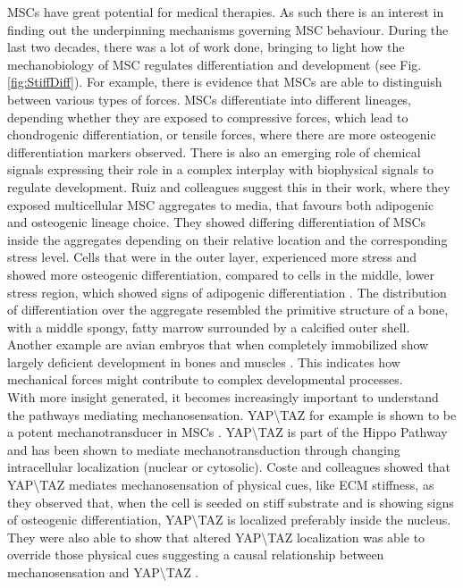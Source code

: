 MSCs have great potential for medical therapies. As such there is an interest in finding out the underpinning mechanisms governing MSC behaviour. During the last two decades, there was a lot of work done, bringing to light how the mechanobiology of MSC regulates differentiation and development (see Fig. \ref{fig:StiffDiff}). For example, there is evidence that MSCs are able to distinguish between various types of forces. MSCs differentiate into different lineages, depending whether they are exposed to compressive forces, which lead to chondrogenic differentiation, or tensile forces, where there are more osteogenic differentiation markers observed.\cite{Kearney2010, Saitoh2000} There is also an emerging role of chemical signals expressing their role in a complex interplay with biophysical signals to regulate development. Ruiz and colleagues suggest this in their work, where they exposed multicellular MSC aggregates to media, that favours both adipogenic and osteogenic lineage choice. They showed differing differentiation of MSCs inside the aggregates depending on their relative location and the corresponding stress level. Cells that were in the outer layer, experienced more stress and showed more osteogenic differentiation, compared to cells in the middle, lower stress region, which showed signs of adipogenic differentiation \cite{Ruiz2008}. The distribution of differentiation over the aggregate resembled the primitive structure of a bone, with a middle spongy, fatty marrow surrounded by a calcified outer shell. Another example are avian embryos that when completely immobilized show largely deficient development in bones and muscles \cite{Castillo2010}. This indicates how mechanical forces might contribute to complex developmental processes.\\ 

With more insight generated, it becomes increasingly important to understand the pathways mediating mechanosensation. YAP\textbackslash{}TAZ for example is shown to be a potent mechanotransducer in MSCs \cite{Halder2012}. YAP\textbackslash{}TAZ is part of the Hippo Pathway and has been shown to mediate mechanotransduction through changing intracellular localization (nuclear or cytosolic). Coste and colleagues showed that YAP\textbackslash{}TAZ mediates mechanosensation of physical cues, like ECM stiffness, as they observed that, when the cell is seeded on stiff substrate and is showing signs of osteogenic differentiation, YAP\textbackslash{}TAZ is localized preferably inside the nucleus. They were also able to show that altered YAP\textbackslash{}TAZ localization was able to override those physical cues suggesting a causal relationship between mechanosensation and YAP\textbackslash{}TAZ \cite{Coste2010}.



